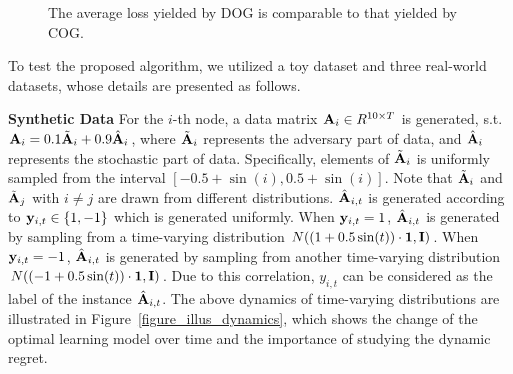 \documentclass{article}
\begin{document}
\begin{figure}[!h]
\caption{The average loss yielded by DOG is comparable to that yielded by COG.}
\label{figure_compare_loss}
\end{figure}




To test the proposed algorithm, we utilized a toy dataset and three real-world datasets, whose details are presented as follows.

\textbf{Synthetic Data} 
For the $i$-th node, a data matrix  ${\bf A}_i\in R^{10\times T}$ is generated, s.t. ${\bf A}_i=0.1\tilde{{\bf A}}_i+0.9\hat{{\bf A}}_i$, where $\tilde{{\bf A}}_i$ represents the adversary part of data, and $\hat{{\bf A}}_i$ represents the stochastic part of data. Specifically,  elements of $\tilde{{\bf A}}_i$ is uniformly sampled from the interval $[-0.5+\sin(i),0.5+\sin(i)]$. Note that $\tilde{{\bf A}}_i$ and $\tilde{{\bf A}}_j$ with $i\neq j$ are drawn from different distributions. $\hat{{\bf A}}_{i,t}$ is generated according to ${\bf y}_{i,t}\in\{1,-1\}$ which is generated uniformly. When ${\bf y}_{i,t}=1$, $\hat{{\bf A}}_{i,t}$ is generated by sampling from a time-varying distribution $N((1+0.5\sin(t))\cdot{\bf 1}, {\bf I})$. When ${\bf y}_{i,t} = -1$, $\hat{{\bf A}}_{i,t}$ is generated by sampling from another time-varying distribution $N((-1+0.5\sin(t))\cdot{\bf 1}, {\bf I})$. Due to this correlation, $y_{i,t}$ can be considered as the label of the instance $\hat{{\bf A}}_{i,t}$.
The above dynamics of time-varying distributions are illustrated in Figure~\ref{figure_illus_dynamics}, which shows the change of the optimal learning model over time and the importance of studying the dynamic regret. 
\end{document}
